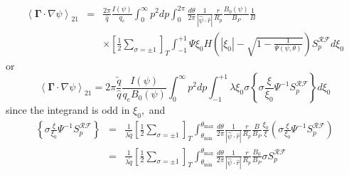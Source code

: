 \begin{eqnarray}
\left\langle \mathbf{\Gamma }\cdot \nabla \psi \right\rangle _{21} &=&\frac{
2\pi }{\widehat{q}}\frac{I\left( \psi \right) }{q_{e}}\int_{0}^{\infty
}p^{2}dp\int_{0}^{2\pi }\frac{d\theta }{2\pi }\frac{1}{\left| \widehat{\psi }
\cdot \widehat{r}\right| }\frac{r}{R_{p}}\frac{B_{0}\left( \psi \right) }{
B_{P}}\frac{1}{B}  \nonumber \\
&&\times \left[ \frac{1}{2}\sum_{\sigma =\pm 1}\right]
_{T}\int_{-1}^{+1}\Psi \xi _{0}H\left( \left| \xi _{0}\right| -\sqrt{1-\frac{
1}{\Psi \left( \psi ,\theta \right) }}\right) S_{p}^{\mathcal{RF}}d\xi _{0}
\end{eqnarray}
or
\begin{equation}
\left\langle \mathbf{\Gamma }\cdot \nabla \psi \right\rangle _{21}=2\pi
\frac{\widetilde{q}}{\widehat{q}}\frac{I\left( \psi \right) }{
q_{e}B_{0}\left( \psi \right) }\int_{0}^{\infty
}p^{2}dp\int_{-1}^{+1}\lambda \xi _{0}\sigma \left\{ \sigma \frac{\xi }{\xi
_{0}}\Psi ^{-1}S_{p}^{\mathcal{RF}}\right\} d\xi _{0}
\end{equation}
since the integrand is odd in $\xi _{0},$ and
\begin{eqnarray}
\left\{ \sigma \frac{\xi }{\xi _{0}}\Psi ^{-1}S_{p}^{\mathcal{RF}}\right\}
&=&\frac{1}{\lambda \widetilde{q}}\left[ \frac{1}{2}\sum_{\sigma =\pm
1}\right] _{T}\int_{\theta _{\min }}^{\theta _{\max }}\frac{d\theta }{2\pi }%
\frac{1}{\left| \widehat{\psi }\cdot \widehat{r}\right| }\frac{r}{R_{p}}%
\frac{B}{B_{P}}\frac{\xi _{0}}{\xi }\left( \sigma \frac{\xi }{\xi _{0}}\Psi
^{-1}S_{p}^{\mathcal{RF}}\right)  \nonumber \\
&=&\frac{1}{\lambda \widetilde{q}}\left[ \frac{1}{2}\sum_{\sigma =\pm
1}\right] _{T}\int_{\theta _{\min }}^{\theta _{\max }}\frac{d\theta }{2\pi }%
\frac{1}{\left| \widehat{\psi }\cdot \widehat{r}\right| }\frac{r}{R_{p}}%
\frac{B_{0}}{B_{P}}\sigma S_{p}^{\mathcal{RF}}
\end{eqnarray}

